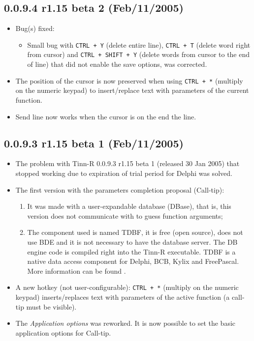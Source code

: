 \subsection{0.0.9.4 r1.15 beta 2 (Feb/11/2005)}

\begin{itemize}
  \item Bug(s) fixed:
    \begin{itemize}
      \item Small bug with \texttt{CTRL + Y} (delete entire line),
        \texttt{CTRL + T} (delete word right from cursor) and \texttt{CTRL + SHIFT + Y}
        (delete words from cursor to the end of line) that did not enable the save options, was corrected.
    \end{itemize}
  \item The position of the cursor is now preserved when using \texttt{CTRL + *} (multiply on the numeric keypad)
    to insert/replace text with parameters of the current \RR{} function.
  \item Send line now works when the cursor is on the end the line.
\end{itemize}

\subsection{0.0.9.3 r1.15 beta 1 (Feb/11/2005)}
\begin{itemize}
  \item The problem with Tinn-R 0.0.9.3 r1.15 beta 1 (released 30 Jan 2005) that stopped working due to expiration
    of trial period for Delphi was solved.
  \item The first version with the \RR{} parameters completion proposal (Call-tip):
    \begin{enumerate}
      \item It was made with a user-expandable database (DBase), that is, this version does not communicate with
        \RR{} to guess \RR{} function arguments;
      \item The component used is named TDBF, it is free (open source), does not use BDE and it is not necessary
        to have the database server. The DB engine code is compiled right into the Tinn-R executable.
        TDBF is a native data access component for Delphi, BCB, Kylix and FreePascal.
        More information can be found .
    \end{enumerate}
  \item A new hotkey (not user-configurable): \texttt{CTRL + *} (multiply on the numeric keypad) inserts/replaces
    text with parameters of the active function (a call-tip must be visible).
  \item The \textit{Application options} was reworked. It is now possible to set the basic
    application options for \RR{} Call-tip.
\end{itemize}

